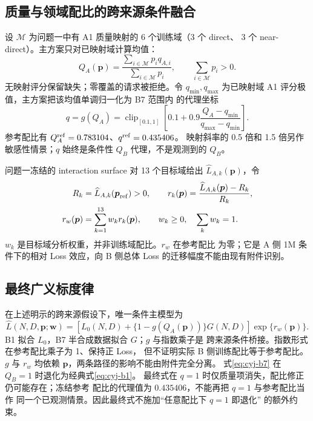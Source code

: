 \subsection{质量与领域配比的跨来源条件融合}

设 $\mathcal M$ 为问题一中有 A1 质量映射的 6 个训练域（3 个 direct、
3 个 near-direct）。主方案只对已映射域计算均值：
\begin{equation}\label{eq:cyj-qa}
Q_A(\boldsymbol p)=\frac{\sum_{i\in\mathcal M}p_iq_{A,i}}
{\sum_{i\in\mathcal M}p_i},\qquad \sum_{i\in\mathcal M}p_i>0.
\end{equation}
无映射评分保留缺失；零覆盖的请求被拒绝。令 $q_{\min},q_{\max}$
为已映射域 A1 评分极值，主方案把该均值单调归一化为 B7 范围内
的代理坐标
\begin{equation}\label{eq:cyj-qproxy}
q=g(Q_A)=\operatorname{clip}_{[0.1,1]}
\left[0.1+0.9\frac{Q_A-q_{\min}}{q_{\max}-q_{\min}}\right].
\end{equation}
参考配比有 $Q_A^{\rm ref}=0.783104$、$q^{\rm ref}=0.435406$。
映射斜率的 0.5 倍和 1.5 倍另作敏感性情景；$q$ 始终是条件性
$Q_B$ 代理，不是观测到的 $Q_B$。

问题一冻结的 interaction surface 对 13 个目标域给出
$\widehat L_{A,k}(\boldsymbol p)$，令
\begin{align}\label{eq:cyj-rp}
R_k&=\widehat L_{A,k}(\boldsymbol p_{\rm ref})>0,\qquad
r_k(\boldsymbol p)=\frac{\widehat L_{A,k}(\boldsymbol p)-R_k}{R_k},\\
r_w(\boldsymbol p)&=\sum_{k=1}^{13}w_kr_k(\boldsymbol p),\qquad
w_k\geq0,\quad\sum_kw_k=1.
\end{align}
$w_k$ 是目标域分析权重，并非训练域配比。$r_w$ 在参考配比
为零；它是 A 侧 1M 条件下的相对 Loss 效应，向 B 侧总体 Loss
的迁移幅度不能由现有附件识别。

\subsection{最终广义标度律}

在上述明示的跨来源假设下，唯一条件主模型为
\begin{equation}\label{eq:cyj-v8}
\boxed{\widehat L(N,D,\boldsymbol p;\boldsymbol w)=
\left[L_0(N,D)+\{1-g(Q_A(\boldsymbol p))\}G(N,D)\right]
\exp\{r_w(\boldsymbol p)\}.}
\end{equation}
B1 拟合 $L_0$，B7 半合成数据拟合 $G$；$g$ 与指数乘子是
跨来源条件桥接。指数形式在参考配比乘子为 1、保持正 Loss，
但不证明实际 B 侧训练配比等于参考配比。$g$ 与 $r_w$ 均依赖
$\boldsymbol p$，两条路径的影响不能由附件完全分离。
式\eqref{eq:cyj-b7} 在 $Q_B=1$ 时退化为经典式\eqref{eq:cyj-b1}。
最终式在 $q=1$ 时仅质量项消失，配比修正仍可能存在；冻结参考
配比的代理值为 $0.435406$，不能再把 $q=1$ 与参考配比当作
同一个已观测情景。因此最终式不施加“任意配比下 $q=1$ 即退化”
的额外约束。

